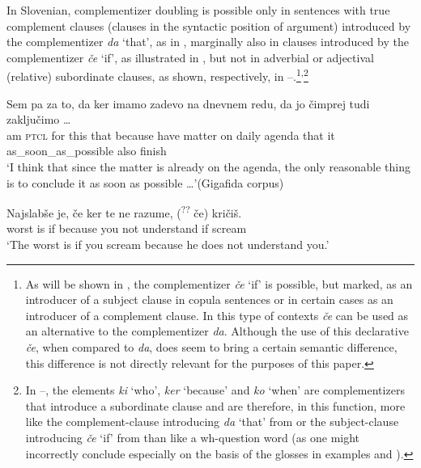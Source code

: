 \documentclass[output=paper,
]{langscibook}
\begin{document}
In Slovenian, complementizer doubling is possible only in sentences with true complement clauses (clauses in the syntactic position of argument) introduced by the complementizer \textit{da} `that', as in , marginally also in clauses introduced by the complementizer \textit{če} `if', as illustrated in , but not in adverbial or adjectival (relative) subordinate clauses, as shown, respectively, in --.\footnote{As will be shown in , the complementizer \textit{če} `if' is possible, but marked, as an introducer of a subject clause in copula sentences or in certain cases as an introducer of a complement clause. In this type of contexts \textit{če} can be used as an alternative to the complementizer \textit{da}. Although the use of this declarative \textit{če}, when compared to \textit{da}, does seem to bring a certain semantic difference, this difference is not directly relevant for the purposes of this paper.}\textsuperscript{,}\footnote{In --, the elements \textit{ki} `who', \textit{ker} `because' and \textit{ko} `when' are complementizers that introduce a subordinate clause and are therefore, in this function, more like the complement-clause introducing \textit{da} `that' from  or the subject-clause introducing \textit{če} `if' from  than like a wh-question word (as one might incorrectly conclude especially on the basis of the glosses in examples  and ).}

\begin{exe} 
\ex \label{ex:plesnicar:nine}
\gll  Sem	pa	za	to,	da	ker		imamo	zadevo	na dnevnem	redu,	da	jo	čimprej	tudi	zaključimo {\ldots}\\
 am	\textsc{ptcl}	for	this	that	because	have	matter	on daily		agenda	that	it	as\_soon\_as\_possible		also	finish	\\
\trans `I think that since the matter is already on the agenda, the only reasonable thing is to conclude it as soon as possible {\ldots}'\hfill (Gigafida corpus) 
\end{exe}

\begin{exe} 
\ex \label{ex:plesnicar:ten}
\gll Najslabše 	je,	če	ker		te	ne	razume,	(\textsuperscript{??}\hspace{-2pt} če) kričiš. \\
	worst		is	if	because	you	not	understand	{} if scream\\
\trans `The worst is if you scream because he does not understand you.' 
\end{exe}
\end{document}
